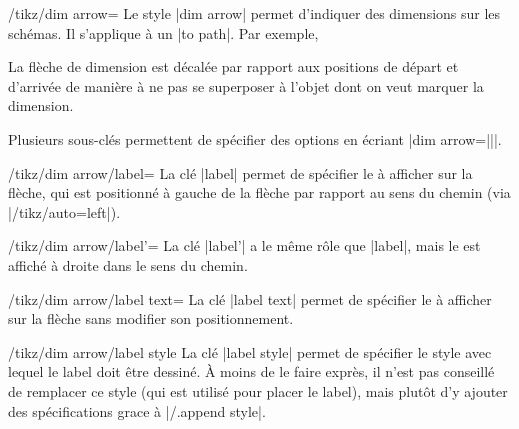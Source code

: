 \documentclass[a4paper]{ltxdoc}
\begin{document}
\begin{stylekey}{/tikz/dim arrow=}
  Le style |dim arrow| permet d'indiquer des dimensions sur les schémas. Il s'applique à un |to path|. Par exemple,

  \begin{codeexample}[width=4cm]
  \end{codeexample}

  La flèche de dimension est décalée par rapport aux positions de départ et d'arrivée de manière à ne pas se superposer
  à l'objet dont on veut marquer la dimension.

  Plusieurs sous-clés permettent de spécifier des options en écriant |dim arrow={||}|.

  \begin{key}{/tikz/dim arrow/label=}
  La clé |label| permet de spécifier le  à afficher sur la flèche, qui est positionné à gauche de la flèche par rapport au sens du chemin (via |/tikz/auto=left|).
  \end{key}

  \begin{key}{/tikz/dim arrow/label'=}
  La clé |label'| a le même rôle que |label|, mais le  est affiché à droite dans le sens du chemin.
  \end{key}


\begin{codeexample}[]
\end{codeexample}

  \begin{key}{/tikz/dim arrow/label text=}
  La clé |label text| permet de spécifier le  à afficher sur la flèche sans modifier son positionnement.
  \end{key}

  \begin{stylekey}{/tikz/dim arrow/label style}
  La clé |label style| permet de spécifier le style avec lequel le label doit être dessiné.
  À moins de le faire exprès, il n'est pas conseillé de remplacer ce style (qui est utilisé pour placer le label), mais plutôt d'y ajouter des spécifications grace à |/.append style|.


\end{stylekey}
\end{stylekey}
\end{document}
